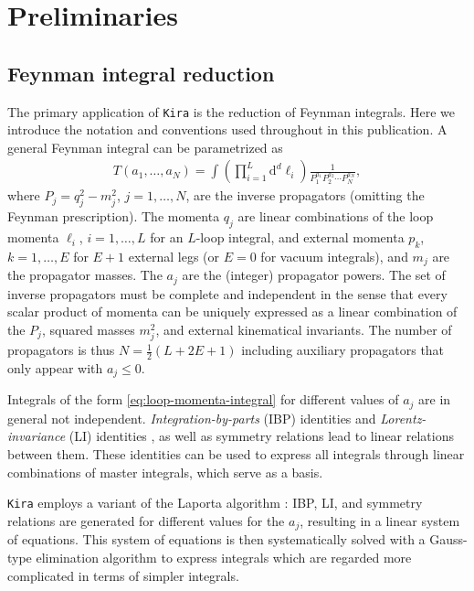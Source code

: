 \documentclass[11pt,a4paper,DIV=11,numbers=noenddot,parskip=half]{scrartcl}
\newcommand{\code}[1]{\texttt{#1}}
\newcommand*{\kira}{\code{Kira}}
\begin{document}
\section{Preliminaries}
\label{sect:prelimineries}

\subsection{Feynman integral reduction}
\label{sect:feynman-integral-reduction}

The primary application of \kira{} is the reduction of Feynman integrals.
Here we introduce the notation and conventions used throughout in this publication.
A general Feynman integral can be parametrized as
%
\begin{align}
  T(a_1,\dots,a_N)
  = \int \left(\prod\limits_{i=1}^L \mathrm{d}^d\ell_i\right)
    \frac{1}{P_1^{a_1} P_2^{a_2} \cdots P_N^{a_N}},
  \label{eq:loop-momenta-integral}
\end{align}
%
where $P_j=q_j^2-m_j^2$, $j=1,\dots,N$, are the inverse propagators (omitting the Feynman prescription).
The momenta $q_j$ are linear combinations of the loop momenta $\ell_i$, $i=1,\dots,L$ for an $L$-loop integral, and external momenta $p_k$, $k=1,\dots,E$ for $E+1$ external legs (or $E=0$ for vacuum integrals), and $m_j$ are the propagator masses.
The $a_j$ are the (integer) propagator powers.
The set of inverse propagators must be complete and independent in the sense that every scalar product of momenta can be uniquely expressed as a linear combination of the $P_j$, squared masses $m_j^2$, and external kinematical invariants.
The number of propagators is thus $N=\frac{1}{2}(L+2 E+1)$ including auxiliary propagators that only appear with $a_j\le 0$.

Integrals of the form \eqref{eq:loop-momenta-integral} for different values of $a_j$ are in general not independent.
\emph{Integration-by-parts} (IBP) identities \cite{Tkachov:1981wb,Chetyrkin:1981qh} and \emph{Lorentz-invariance} (LI) identities \cite{Gehrmann:1999as}, as well as symmetry relations lead to linear relations between them.
These identities can be used to express all integrals through linear combinations of master integrals, which serve as a basis.

\kira{} employs a variant of the Laporta algorithm \cite{Laporta:2001dd}:
IBP, LI, and symmetry relations are generated for different values for the $a_j$, resulting in a linear system of equations.
This system of equations is then systematically solved with a Gauss-type elimination algorithm to express integrals which are regarded more complicated in terms of simpler integrals.
\end{document}
